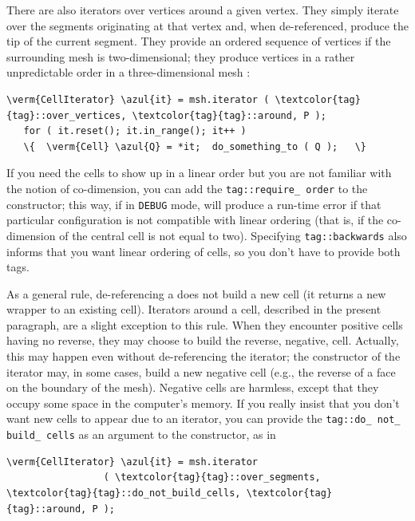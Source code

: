 There are also iterators over vertices around a given vertex.
They simply iterate over the segments originating at that vertex and,
when de-referenced, produce the tip of the current segment.
They provide an ordered sequence of vertices if the surrounding mesh is two-dimensional;
they produce vertices in a rather unpredictable order in a three-dimensional mesh :

\begin{Verbatim}[commandchars=\\\{\},formatcom=\small\tt,
   baselinestretch=0.94,framesep=2mm                      ]
   \verm{CellIterator} \azul{it} = msh.iterator ( \textcolor{tag}{tag}::over_vertices, \textcolor{tag}{tag}::around, P );
   for ( it.reset(); it.in_range(); it++ )
   \{  \verm{Cell} \azul{Q} = *it;  do_something_to ( Q );   \}
\end{Verbatim}

If you need the cells to show up in a linear order but you are not familiar
with the notion of co-dimension, you can add the {\small\tt\textcolor{tag}{tag}::require\_\,order}
to the {\small\tt{}} constructor;
this way, if in {\small\tt DEBUG} mode, {\maniFEM} will produce a run-time error
if that particular configuration is not compatible with linear ordering
(that is, if the co-dimension of the central cell is not equal to two).
Specifying {\small\tt\textcolor{tag}{tag}::backwards} also informs {\maniFEM} that you want
linear ordering of cells, so you don't have to provide both tags.

As a general rule, de-referencing a {\small\tt{}} does not build a new
cell (it returns a new wrapper to an existing cell).
Iterators around a cell, described in the present paragraph, are a slight exception to this
rule.
When they encounter positive cells having no reverse, they may choose to build the reverse,
negative, cell.
Actually, this may happen even without de-referencing the iterator;
the constructor of the iterator may, in some cases, build a new negative cell
(e.g., the reverse of a face on the boundary of the mesh).
Negative cells are harmless, except that they occupy some space in the computer's memory.
If you really insist that you don't want new cells to appear due to an iterator,
you can provide the {\small\tt\textcolor{tag}{tag}::do\_\,not\_\,build\_\,cells} as an argument
to the constructor, as in

\begin{Verbatim}[commandchars=\\\{\},formatcom=\small\tt,
   baselinestretch=0.94,framesep=2mm                      ]
   \verm{CellIterator} \azul{it} = msh.iterator
                 ( \textcolor{tag}{tag}::over_segments, \textcolor{tag}{tag}::do_not_build_cells, \textcolor{tag}{tag}::around, P );
\end{Verbatim}


